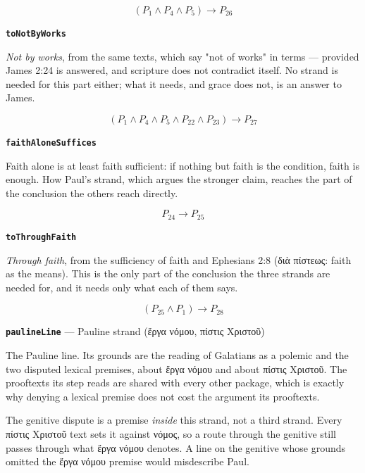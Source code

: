 \documentclass[11pt]{article}
\begin{document}
\[(P_{1} \land P_{4} \land P_{5}) \rightarrow P_{26}\]
\par\medskip\noindent\textbf{\texttt{to\allowbreak{}Not\allowbreak{}By\allowbreak{}Works}}\par\nobreak\noindent
\emph{Not by works}, from the same texts, which say "not of works" in terms — provided James 2:24 is answered, and scripture does not contradict itself. No strand is needed for this part either; what it needs, and grace does not, is an answer to James.

\[(P_{1} \land P_{4} \land P_{5} \land P_{22} \land P_{23}) \rightarrow P_{27}\]
\par\medskip\noindent\textbf{\texttt{faith\allowbreak{}Alone\allowbreak{}Suffices}}\par\nobreak\noindent
Faith alone is at least faith sufficient: if nothing but faith is the condition, faith is enough. How Paul's strand, which argues the stronger claim, reaches the part of the conclusion the others reach directly.

\[P_{24} \rightarrow P_{25}\]
\par\medskip\noindent\textbf{\texttt{to\allowbreak{}Through\allowbreak{}Faith}}\par\nobreak\noindent
\emph{Through faith}, from the sufficiency of faith and Ephesians 2:8 (διὰ πίστεως: faith as the means). This is the only part of the conclusion the three strands are needed for, and it needs only what each of them says.

\[(P_{25} \land P_{1}) \rightarrow P_{28}\]
\par\medskip\noindent\textbf{\texttt{pauline\allowbreak{}Line}} --- Pauline strand (ἔργα νόμου, πίστις Χριστοῦ)\par\nobreak\noindent
The Pauline line. Its grounds are the reading of Galatians as a polemic and the two disputed lexical premises, about ἔργα νόμου and about πίστις Χριστοῦ. The prooftexts its step reads are shared with every other package, which is exactly why denying a lexical premise does not cost the argument its prooftexts.

The genitive dispute is a premise \emph{inside} this strand, not a third strand. Every πίστις Χριστοῦ text sets it against νόμος, so a route through the genitive still passes through what ἔργα νόμου denotes. A line on the genitive whose grounds omitted the ἔργα νόμου premise would misdescribe Paul.
\end{document}
